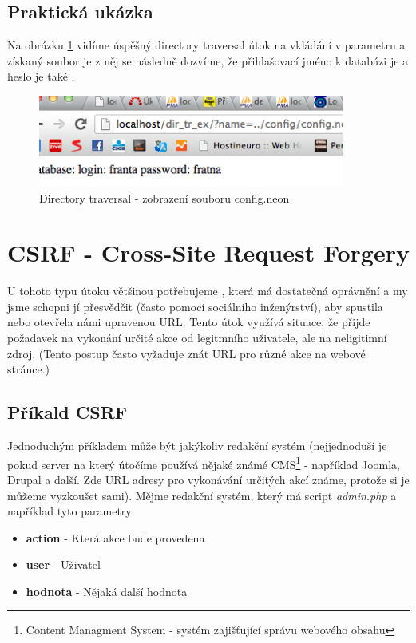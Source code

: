 \documentclass[12pt, a4paper]{report}
\begin{document}
\subsection{Praktická ukázka}
Na obrázku \ref{obr.directory} vidíme úspěšný directory traversal útok na vkládání v parametru  a získaný soubor je  z něj se následně dozvíme, že přihlašovací jméno k databázi je  a heslo je také .
\begin{figure}[h!]
\centerline{\includegraphics[width=380px]{./examples/dir_example.png}}
\caption{Directory traversal - zobrazení souboru config.neon}
\label{obr.directory}
\end{figure}

\section{CSRF - Cross-Site Request Forgery}
U tohoto typu útoku většinou potřebujeme , která má dostatečná oprávnění a my jsme schopni jí přesvědčit (často pomocí sociálního inženýrství), aby spustila nebo otevřela námi upravenou URL. Tento útok využívá situace, že přijde požadavek na vykonání určité akce od legitmního uživatele, ale na neligitimní zdroj. (Tento postup často vyžaduje znát URL pro různé akce na webové stránce.)
\subsection{Příkald CSRF}
Jednoduchým příkladem může být jakýkoliv redakční systém (nejjednoduší je pokud server na který útočíme používá nějaké známé CMS\footnote{Content Managment System - systém zajišťující správu webového obsahu} - například Joomla, Drupal a další. Zde URL adresy pro vykonávání určitých akcí známe, protože si je můžeme vyzkoušet sami). Mějme redakční systém, který má script \textit{admin.php} a například tyto parametry:
\begin{itemize}
\item \textbf{action} - Která akce bude provedena
\item \textbf{user} - Uživatel
\item \textbf{hodnota} - Nějaká další hodnota
\end{itemize}
\end{document}
